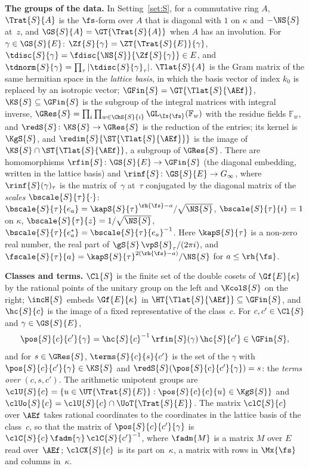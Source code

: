 \documentclass[11pt,a4paper]{article}
\newcommand{\F}{\mathbb{F}}
\newcommand{\m}[1]{\mbox{$#1$}}        %
\newcommand{\subhead}[1]{\par\addvspace{9pt plus 2pt}\Needspace{4\baselineskip}\noindent\textbf{#1}\enspace\ignorespaces}
\theoremstyle{plainx}
\theoremstyle{uprightx}
\renewcommand{\m}[1]{$#1$}
\newcommand{\sro}{\rh{\fs}}
\newcommand{\Nn}{\NS{S}}
\newcommand{\gq}{\gS{S}}
\newcommand{\ri}[1]{\rinf{S}(#1)}
\newcommand{\rfi}[1]{\rfin{S}(#1)}
\newcommand{\Ginf}{G_{\infty}}
\newcommand{\TE}{\Trat{S}{E}}
\newcommand{\Tl}{\Tlat{S}{\AEf}}
\newcommand{\UE}{\UT{\TE}}
\newcommand{\UoE}{\UoT{\TE}}
\newcommand{\Sbar}{\redim{S}{\ST{\Tl}}}
\begin{document}
\subhead{The groups of the data.} In Setting~\ref{set:S}, for a commutative ring $A$, \m{\Trat{S}{A}} is the
$\fs$-form over $A$ that is diagonal with $1$ on $\kappa$ and \m{-\Nn} at~$z$, and \m{\GS{S}{A}=\GT{\Trat{S}{A}}}
when $A$ has an involution. For \m{\gamma\in\GS{S}{E}}:
\m{\Zf{S}{\gamma}=\ZT{\TE}{\gamma}}, \m{\tdisc{S}{\gamma}=\fdisc{\Nn}{\Zf{S}{\gamma}}\in E}, and
\m{\tdnorm{S}{\gamma}=\prod_\tau|\tdisc{S}{\gamma}_\tau|}. \m{\Tlat{S}{A}} is the Gram matrix of the same hermitian
space in the \emph{lattice basis}, in which the basis vector of index $k_0$ is replaced by an isotropic vector;
\m{\GFin{S}=\GT{\Tl}}, \m{\KS{S}\subseteq\GFin{S}} is the subgroup of the integral matrices with integral inverse,
\m{\GRes{S}=\prod_{i}\prod_{w\in\ChS{S}{i}}\GL_{\Ix{\fs}}(\F_w)} with the residue fields \m{\F_w}, and
\m{\redS{S}\colon\KS{S}\to\GRes{S}} is the reduction of the entries; its kernel is \m{\KgS{S}}, and
\m{\Sbar} is the image of \m{\KS{S}\cap\ST{\Tl}}, a subgroup of \m{\GRes{S}}. There are homomorphisms
\m{\rfin{S}\colon\GS{S}{E}\to\GFin{S}} (the diagonal embedding, written in the lattice basis) and
\m{\rinf{S}\colon\GS{S}{E}\to\Ginf}, where \m{\ri{\gamma}_\tau} is the matrix of~$\gamma$ at~$\tau$ conjugated by
the diagonal matrix of the \emph{scales} \m{\bscale{S}{\tau}{\cdot}}:
\m{\bscale{S}{\tau}{e_a}=\kapS{S}{\tau}^{\sro-a}/\sqrt{\Nn}}, \m{\bscale{S}{\tau}{i}=1} on $\kappa$,
\m{\bscale{S}{\tau}{z}=1/\sqrt{\Nn}}, \m{\bscale{S}{\tau}{e^*_a}=\bscale{S}{\tau}{e_a}^{-1}}. Here
\m{\kapS{S}{\tau}} is a non-zero real number, the real part of \m{\gq\,\vpS{S}_\tau/(2\pi i)}, and
\m{\fscale{S}{\tau}{a}=\kapS{S}{\tau}^{2(\sro-a)}/\Nn} for \m{a\le\sro}.

\subhead{Classes and terms.} \m{\Cl{S}} is the finite set of the double cosets of \m{\Gf{E}{\kappa}} by the
rational points of the unitary group on the left and \m{\KcolS{S}} on the right; \m{\incH{S}} embeds
\m{\Gf{E}{\kappa}} in \m{\HT{\Tl}\subseteq\GFin{S}}, and \m{\hc{S}{c}} is the image of a fixed representative of the class~$c$. For
\m{c,c'\in\Cl{S}} and \m{\gamma\in\GS{S}{E}},
\[\pos{S}{c}{c'}{\gamma}=\hc{S}{c}^{-1}\,\rfi{\gamma}\,\hc{S}{c'}\in\GFin{S},\]
and for \m{s\in\GRes{S}}, \m{\terms{S}{c}{s}{c'}} is the set of the $\gamma$ with \m{\pos{S}{c}{c'}{\gamma}\in\KS{S}}
and \m{\redS{S}(\pos{S}{c}{c'}{\gamma})=s}: the \emph{terms over} \m{(c,s,c')}. The arithmetic unipotent groups are
\m{\clU{S}{c}=\{u\in\UE:\pos{S}{c}{c}{u}\in\KgS{S}\}} and \m{\clUo{S}{c}=\clU{S}{c}\cap\UoE}. The matrix
\m{\clC{S}{c}} over \m{\AEf} takes rational coordinates to the coordinates in the lattice basis of the class~$c$,
so that the matrix of \m{\pos{S}{c}{c'}{\gamma}} is \m{\clC{S}{c}\,\fadm{\gamma}\,\clC{S}{c'}^{-1}}, where
\m{\fadm{M}} is a matrix $M$ over $E$ read over~\m{\AEf}; \m{\clCX{S}{c}} is its part on~$\kappa$, a matrix with
rows in \m{\Mx{\fs}} and columns in~$\kappa$.
\end{document}
